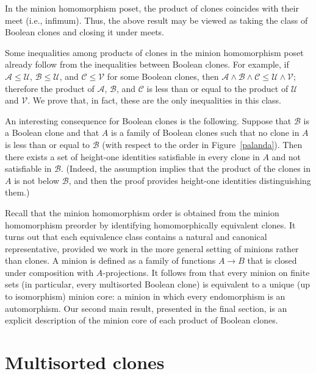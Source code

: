 \documentclass{amsart}
\numberwithin{equation}{section}
\theoremstyle{plain}
\theoremstyle{definition}
\def\clone#1{\mathcal{#1}}
\begin{document}
In the minion homomorphism poset, the product of clones coincides with their meet (i.e., infimum). Thus, the above result may be viewed as taking the class of Boolean clones and closing it under meets.
    
    Some inequalities among products of clones in the minion homomorphism poset already follow from the inequalities between Boolean clones. For example, if  $\clone{A} \le \clone{U}$, $\clone{B} \le \clone{U}$, and $\clone{C} \le \clone{V}$ for some Boolean clones, then $\clone{A} \wedge \clone{B} \wedge \clone{C} \le \clone{U} \wedge \clone{V}$; therefore the product of $\clone{A}$, $\clone{B}$, and $\clone{C}$ is less than or equal to the product of $\clone{U}$ and $\clone{V}$. We prove that, in fact, these are the only inequalities in this class.

An interesting consequence for Boolean clones is the following. 
Suppose that $\clone{B}$ is a Boolean clone and that $A$ is a family of Boolean clones such that no clone in $A$ is less than or equal to $\clone{B}$ (with respect to the order in Figure~\ref{palanda}). Then there exists a set of height-one identities satisfiable in every clone in $A$ and not satisfiable in $\clone{B}$. (Indeed, the assumption implies that the product of the clones in $A$ is not below $\clone{B}$, and then the proof provides height-one identities distinguishing them.)

Recall that
the minion homomorphism order is obtained from the minion homomorphism preorder by identifying homomorphically equivalent clones.
It turns out that each equivalence class contains a natural and canonical representative, provided we work in the more general setting of minions rather than clones. A minion is defined as a family of functions $A \to B$ that is closed under composition with $A$-projections. It follows from \cite{kapytka} that every minion on finite sets (in particular, every multisorted Boolean clone) is equivalent to a unique (up to isomorphism) minion core: a minion in which every endomorphism is an automorphism. 
Our second main result, presented in the final section, is an explicit description of the minion core of each product of Boolean clones.

\begin{figure}
\end{figure}

\section{Multisorted clones}
\end{document}

